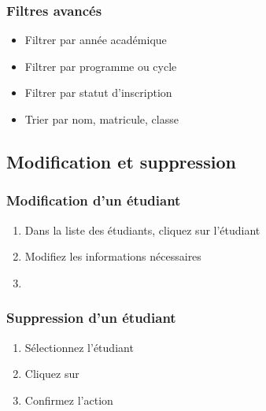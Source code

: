 \subsubsection{Filtres avancés}

\begin{itemize}[leftmargin=*]
    \item Filtrer par année académique
    \item Filtrer par programme ou cycle
    \item Filtrer par statut d'inscription
    \item Trier par nom, matricule, classe
\end{itemize}

\subsection{Modification et suppression}

\subsubsection{Modification d'un étudiant}

\begin{enumerate}[leftmargin=*]
    \item Dans la liste des étudiants, cliquez sur l'étudiant
    \item Modifiez les informations nécessaires
    \item {}
\end{enumerate}


\subsubsection{Suppression d'un étudiant}

\begin{enumerate}[leftmargin=*]
    \item Sélectionnez l'étudiant
    \item Cliquez sur 
    \item Confirmez l'action
\end{enumerate}


